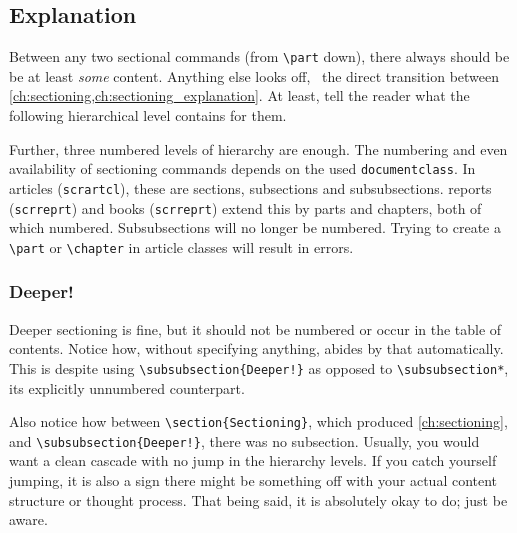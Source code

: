 \subsection{Explanation}
\label{ch:sectioning_explanation}

Between any two sectional commands (from \verb|\part| down), there always should be
be at least \emph{some} content.
Anything else looks off, \ the direct transition between
\cref{ch:sectioning,ch:sectioning_explanation}.
At least, tell the reader what the following hierarchical level contains for them.

Further, three numbered levels of hierarchy are enough.
The numbering and even availability of sectioning commands depends on the used
\verb|documentclass|.
In  articles (\verb|scrartcl|), these are sections,
subsections and subsubsections.
 reports (\verb|scrreprt|) and books (\verb|scrreprt|)
extend this by parts and chapters, both of which numbered.
Subsubsections will no longer be numbered.
Trying to create a \verb|\part| or \verb|\chapter| in article classes will result
in errors.

\subsubsection{Deeper!}

Deeper sectioning is fine, but it should not be numbered or occur in the table of
contents.
Notice how, without specifying anything,  abides by that
automatically.
This is despite using \verb|\subsubsection{Deeper!}| as opposed to \verb|\subsubsection*|,
its explicitly unnumbered counterpart.

Also notice how between \verb|\section{Sectioning}|, which produced \cref{ch:sectioning},
and \verb|\subsubsection{Deeper!}|, there was no subsection.
Usually, you would want a clean cascade with no jump in the hierarchy levels.
If you catch yourself jumping, it is also a sign there might be something off with your
actual content structure or thought process.
That being said, it is absolutely okay to do; just be aware.

